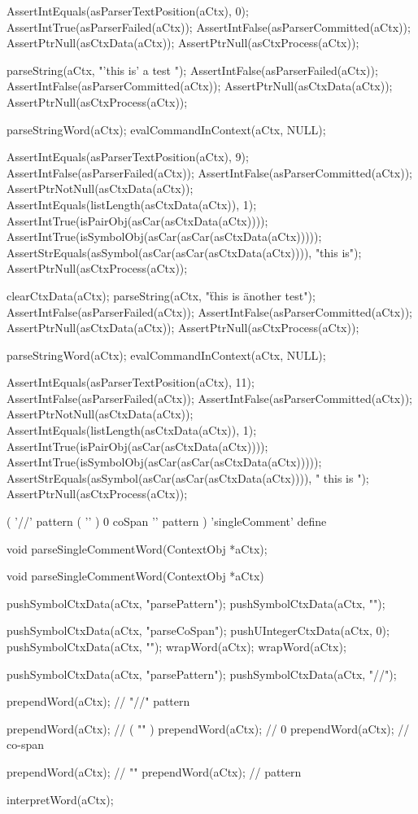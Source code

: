   AssertIntEquals(asParserTextPosition(aCtx), 0);
  AssertIntTrue(asParserFailed(aCtx));
  AssertIntFalse(asParserCommitted(aCtx));
  AssertPtrNull(asCtxData(aCtx));
  AssertPtrNull(asCtxProcess(aCtx));
\stopCTest
\stopTestCase

\startCTest
  parseString(aCtx, "'this is' a test ");
  AssertIntFalse(asParserFailed(aCtx));
  AssertIntFalse(asParserCommitted(aCtx));
  AssertPtrNull(asCtxData(aCtx));
  AssertPtrNull(asCtxProcess(aCtx));
  
  parseStringWord(aCtx);
  evalCommandInContext(aCtx, NULL);
  
  AssertIntEquals(asParserTextPosition(aCtx), 9);
  AssertIntFalse(asParserFailed(aCtx));
  AssertIntFalse(asParserCommitted(aCtx));
  AssertPtrNotNull(asCtxData(aCtx));
  AssertIntEquals(listLength(asCtxData(aCtx)), 1);
  AssertIntTrue(isPairObj(asCar(asCtxData(aCtx))));
  AssertIntTrue(isSymbolObj(asCar(asCar(asCtxData(aCtx)))));
  AssertStrEquals(asSymbol(asCar(asCar(asCtxData(aCtx)))), "this is");
  AssertPtrNull(asCtxProcess(aCtx));

  clearCtxData(aCtx);
  parseString(aCtx, "\" this is \" another test");
  AssertIntFalse(asParserFailed(aCtx));
  AssertIntFalse(asParserCommitted(aCtx));
  AssertPtrNull(asCtxData(aCtx));
  AssertPtrNull(asCtxProcess(aCtx));
  
  parseStringWord(aCtx);
  evalCommandInContext(aCtx, NULL);
  
  AssertIntEquals(asParserTextPosition(aCtx), 11);
  AssertIntFalse(asParserFailed(aCtx));
  AssertIntFalse(asParserCommitted(aCtx));
  AssertPtrNotNull(asCtxData(aCtx));
  AssertIntEquals(listLength(asCtxData(aCtx)), 1);
  AssertIntTrue(isPairObj(asCar(asCtxData(aCtx))));
  AssertIntTrue(isSymbolObj(asCar(asCar(asCtxData(aCtx)))));
  AssertStrEquals(asSymbol(asCar(asCar(asCtxData(aCtx)))), " this is ");
  AssertPtrNull(asCtxProcess(aCtx));
\stopCTest
\stopTestCase
\stopTestSuite

\startTestSuite[parseSingleCommentWord]

\starttyping
(
  '//' pattern
  ( '\n' ) 0 coSpan
  '\n' pattern
) 'singleComment' define
\stoptyping

\startCHeader
void parseSingleCommentWord(ContextObj *aCtx);
\stopCHeader

\startCCode
void parseSingleCommentWord(ContextObj *aCtx) {

  pushSymbolCtxData(aCtx, "parsePattern");
  pushSymbolCtxData(aCtx, "\n");
  
  pushSymbolCtxData(aCtx, "parseCoSpan");
  pushUIntegerCtxData(aCtx, 0);
  pushSymbolCtxData(aCtx, "\n");
  wrapWord(aCtx);
  wrapWord(aCtx);
  
  pushSymbolCtxData(aCtx, "parsePattern");
  pushSymbolCtxData(aCtx, "//");
  
  prependWord(aCtx); // "//" pattern
  
  prependWord(aCtx); // ( "\n" )
  prependWord(aCtx); // 0
  prependWord(aCtx); // co-span
  
  prependWord(aCtx); // "\n"
  prependWord(aCtx); // pattern
  
  interpretWord(aCtx);
}
\stopCCode

